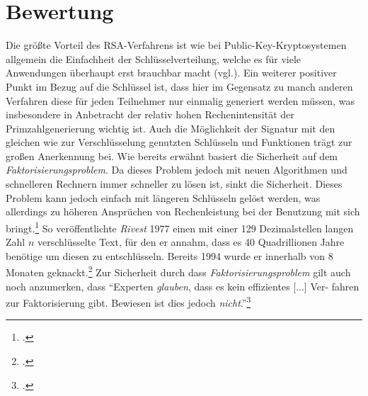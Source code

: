 \documentclass{scrarticle}
\begin{document}
    \section{Bewertung} \label{sec:bewertung}
        Die größte Vorteil des RSA-Verfahrens ist wie bei Public-Key-Kryptosystemen allgemein die Einfachheit der Schlüsselverteilung, welche es für viele Anwendungen überhaupt erst brauchbar macht (vgl.\cite[285]{dankmeier2006}). Ein weiterer positiver Punkt im Bezug auf die Schlüssel ist, dass hier im Gegensatz zu manch anderen Verfahren diese für jeden Teilnehmer nur einmalig generiert werden müssen, was insbesondere in Anbetracht der relativ hohen Rechenintensität der Primzahlgenerierung wichtig ist. Auch die Möglichkeit der Signatur mit den gleichen wie zur Verschlüsselung genutzten Schlüsseln und Funktionen trägt zur großen Anerkennung bei. Wie bereits erwähnt basiert die Sicherheit auf dem \emph{Faktorisierungsproblem}. Da dieses Problem jedoch mit neuen Algorithmen und schnelleren Rechnern immer schneller zu lösen ist, sinkt die Sicherheit. Dieses Problem kann jedoch einfach mit längeren Schlüsseln gelöst werden, was allerdings zu höheren Ansprüchen von Rechenleistung bei der Benutzung mit sich bringt.\footcite[vgl.][]{zum2020} So veröffentlichte \emph{Rivest} 1977 einen mit einer 129 Dezimalstellen langen Zahl $n$ verschlüsselte Text, für den er annahm, dass es 40 Quadrillionen Jahre benötige um diesen zu entschlüsseln. Bereits 1994 wurde er innerhalb von 8 Monaten geknackt.\footcite[vgl.][73]{watjen2008} Zur Sicherheit durch dass \emph{Faktorisierungsproblem} gilt auch noch anzumerken, dass \enquote{Experten \emph{glauben}, dass es kein effizientes [...] Ver-
        fahren zur Faktorisierung gibt. Bewiesen ist dies jedoch \emph{nicht}.}\footcite[80]{ertel2003}
\end{document}
